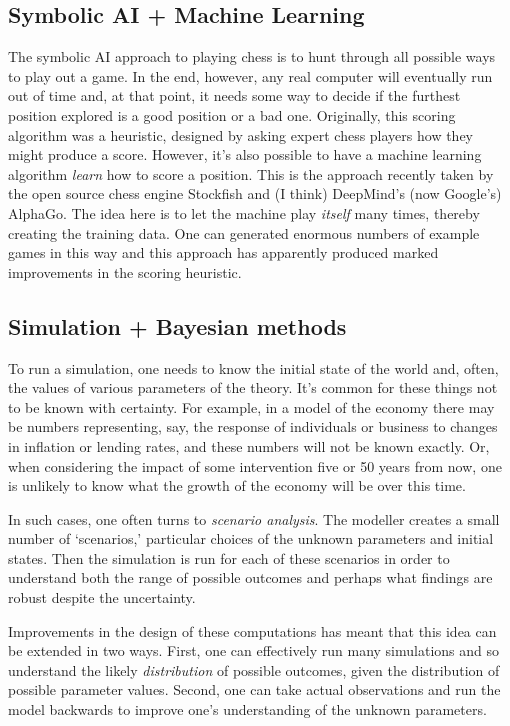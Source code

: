 \documentclass[10pt, a4paper, twocolumn]{article}
\begin{document}
\subsection{Symbolic AI + Machine Learning}

The symbolic AI approach to playing chess is to hunt through all possible ways
to play out a game. In the end, however, any real computer will eventually run
out of time and, at that point, it needs some way to decide if the furthest
position explored is a good position or a bad one. Originally, this scoring
algorithm was a heuristic, designed by asking expert chess players how they
might produce a score. However, it's also possible to have a machine learning
algorithm \emph{learn} how to score a position. This is the approach recently
taken by the open source chess engine Stockfish and (I think) DeepMind's (now
Google's) AlphaGo. The idea here is to let the machine play \emph{itself} many
times, thereby creating the training data. One can generated enormous numbers of
example games in this way and this approach has apparently produced marked
improvements in the scoring heuristic.

\subsection{Simulation + Bayesian methods}

To run a simulation, one needs to know the initial state of the world and,
often, the values of various parameters of the theory. It's common for these
things not to be known with certainty. For example, in a model of the economy
there may be numbers representing, say, the response of individuals or business
to changes in inflation or lending rates, and these numbers will not be known
exactly. Or, when considering the impact of some intervention five or 50 years
from now, one is unlikely to know what the growth of the economy will be over
this time.

In such cases, one often turns to \emph{scenario analysis}. The modeller creates
a small number of `scenarios,' particular choices of the unknown parameters and
initial states. Then the simulation is run for each of these scenarios in order
to understand both the range of possible outcomes and perhaps what findings are
robust despite the uncertainty.

Improvements in the design of these computations has meant that this idea can be
extended in two ways. First, one can effectively run many simulations and so
understand the likely \emph{distribution} of possible outcomes, given the
distribution of possible parameter values. Second, one can take actual
observations and run the model backwards to improve one's understanding of the
unknown parameters.  
\end{document}
